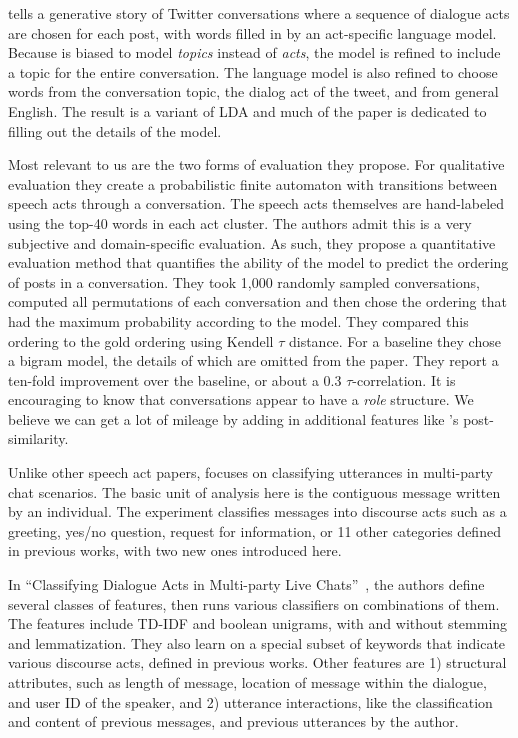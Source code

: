 \documentclass[11pt]{article}
\newcommand{\titlecite}[2]{``#1''~\cite{#2}}
\begin{document}
\cite{Ritter2010a} tells a generative story of Twitter conversations where a sequence of dialogue
acts are chosen for each post, with words filled in by an act-specific language model.
Because is biased to model \textit{topics}
instead of \textit{acts}, the model is refined to include a topic 
for the entire conversation. The language model is also refined to choose words from
the conversation topic, the dialog act of the tweet, and from general English. The result
is a variant of LDA and much of the paper is dedicated to filling out the details of the model.

Most relevant to us are the two forms of evaluation they propose. For
qualitative evaluation they create a probabilistic finite automaton with
transitions between speech acts through a conversation. The speech acts
themselves are hand-labeled using the top-40 words in each act cluster. The 
authors admit this is a very subjective and domain-specific evaluation. As such,
they propose a quantitative evaluation method that quantifies the ability of
the model to predict the ordering of posts in a conversation. They took
1,000 randomly sampled conversations, computed all permutations
of each conversation and then chose the ordering that had the maximum
probability according to the model. They compared this ordering to the gold
ordering using Kendell $\tau$ distance. For a baseline they chose a bigram
model, the details of which are omitted from the paper. They report a ten-fold improvement
over the baseline, or about a 0.3 $\tau$-correlation. It is encouraging to know
that conversations appear to have a \textit{role} structure. We believe we can get a lot of mileage
by adding in additional features like \cite{Wang2008a}'s post-similarity.

Unlike other speech act papers, \cite{Kim2012} focuses on classifying utterances
in multi-party chat scenarios. The basic unit
of analysis here is the contiguous message written by an individual. The
experiment classifies messages into discourse acts such as a greeting, yes/no
question, request for information, or 11 other categories defined in previous
works, with two new ones introduced here.

In \titlecite{Classifying Dialogue Acts in Multi-party Live Chats}{Kim2012}, the
authors define several classes of features, then runs various classifiers on
combinations of them. The features include TD-IDF and boolean unigrams, with
and without stemming and lemmatization. They also learn on a special subset of
keywords that indicate various discourse acts, defined in previous works. Other
features are 1) structural attributes, such as length of message, location of
message within the dialogue, and user ID of the speaker, and 2) utterance
interactions, like the classification and content of previous messages, and
previous utterances by the author.
\end{document}
